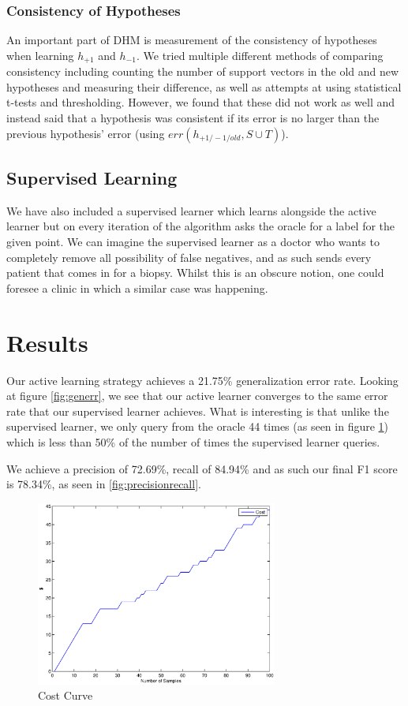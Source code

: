 \documentclass[12pt]{article}
\begin{document}
\subsubsection{Consistency of Hypotheses}
An important part of DHM is measurement of the consistency of hypotheses when learning $h_{+1}$ and $h_{-1}$. We tried multiple different methods of comparing consistency including counting the number of support vectors in the old and new hypotheses and measuring their difference, as well as attempts at using statistical t-tests and thresholding. However, we found that these did not work as well and instead said that a hypothesis was consistent if its error is no larger than the previous hypothesis' error (using $err(h_{+1/-1/old}, S\cup T)$).

\subsection{Supervised Learning}

We have also included a supervised learner which learns alongside the active learner but on every iteration of the algorithm asks the oracle for a label for the given point. We can imagine the supervised learner as a doctor who wants to completely remove all possibility of false negatives, and as such sends every patient that comes in for a biopsy. Whilst this is an obscure notion, one could foresee a clinic in which a similar case was happening. 

\section{Results}
Our active learning strategy achieves a 21.75\% generalization error rate. Looking at figure \ref{fig:generr}, we see that our active learner converges to the same error rate that our supervised learner achieves. What is interesting is that unlike the supervised learner, we only query from the oracle 44 times (as seen in figure \ref{fig:costcurve}) which is less than 50\% of the number of times the supervised learner queries.

We achieve a precision of 72.69\%, recall of 84.94\% and as such our final F1 score is 78.34\%, as seen in \ref{fig:precisionrecall}.

\begin{figure}
	\centering
	\includegraphics[width=300px]{costcurve}
	\caption{Cost Curve}
	\label{fig:costcurve}
\end{figure}
\end{document}
